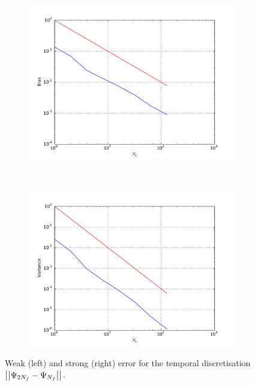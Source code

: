 \documentclass[11pt]{amsart}
\begin{document}
\begin{figure}
    \centering
    \begin{subfigure}[b]{0.4\textwidth}
        \includegraphics[width=\textwidth]{weakerr3.pdf}
    \end{subfigure}
    ~ %
    \begin{subfigure}[b]{0.4\textwidth}
        \includegraphics[width=\textwidth]{strongerr3.pdf}
    \end{subfigure}
    \caption{\label{img:rateFig3} Weak (left) and strong (right) error
    for the temporal discretisation
    $\left| {\left| {{\Psi_{2N_f}-\Psi_{N_f}}} \right|} \right|_{}$.}
\end{figure}
\end{document}
